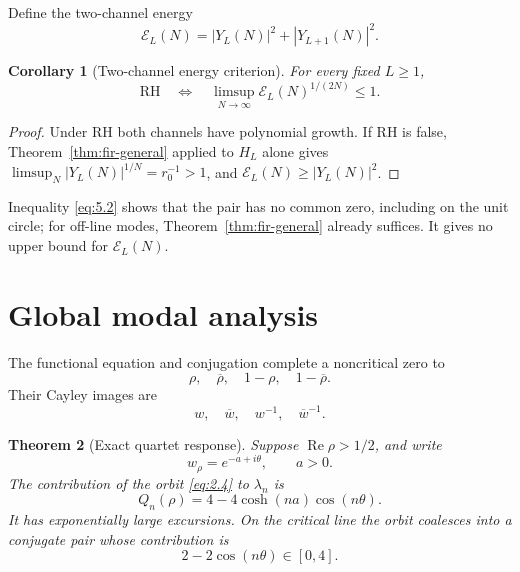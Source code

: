 \documentclass[11pt]{amsart}
\numberwithin{equation}{section}
\newtheorem{theorem}{Theorem}[section]
\newtheorem{corollary}[theorem]{Corollary}
\theoremstyle{definition}
\theoremstyle{remark}
\newcommand{\RH}{\mathrm{RH}}
\renewcommand{\Re}{\operatorname{Re}}
\begin{document}
Define the two-channel energy
\begin{equation}
 \mathcal E_L(N)=|Y_L(N)|^2+|Y_{L+1}(N)|^2.              \label{eq:5.3}
\end{equation}

\begin{corollary}[Two-channel energy criterion]
\label{cor:energy}
For every fixed \(L\ge1\),
\begin{equation}
 \RH\quad\Longleftrightarrow\quad
 \limsup_{N\to\infty}\mathcal E_L(N)^{1/(2N)}\le1.
                                                        \label{eq:5.4}
\end{equation}
\end{corollary}

\begin{proof}
Under RH both channels have polynomial growth. If RH is false,
Theorem~\ref{thm:fir-general} applied to \(H_L\) alone gives
\(\limsup_N|Y_L(N)|^{1/N}=r_0^{-1}>1\), and
\(\mathcal E_L(N)\ge|Y_L(N)|^2\).
\end{proof}

Inequality \eqref{eq:5.2} shows that the pair has no common zero, including on
the unit circle; for off-line modes, Theorem~\ref{thm:fir-general} already
suffices. It gives no upper bound for \(\mathcal E_L(N)\).

\section{Global modal analysis}
\label{sec:global-modes}

The functional equation and conjugation complete a noncritical zero to
\begin{equation}
 \rho,\quad\overline\rho,\quad1-\rho,\quad1-\overline\rho.
                                                        \label{eq:2.4}
\end{equation}
Their Cayley images are
\begin{equation}
 w,\quad\overline w,\quad w^{-1},\quad\overline w^{-1}.
                                                        \label{eq:2.5}
\end{equation}

\begin{theorem}[Exact quartet response]
\label{thm:quartet}
Suppose \(\Re\rho>1/2\), and write
\[
 w_\rho=e^{-a+i\theta},\qquad a>0.
\]
The contribution of the orbit \eqref{eq:2.4} to \(\lambda_n\) is
\begin{equation}
 Q_n(\rho)=4-4\cosh(na)\cos(n\theta).                    \label{eq:2.6}
\end{equation}
It has exponentially large excursions. On the critical line the orbit
coalesces into a conjugate pair whose contribution is
\begin{equation}
 2-2\cos(n\theta)\in[0,4].                               \label{eq:2.7}
\end{equation}
\end{theorem}
\end{document}
